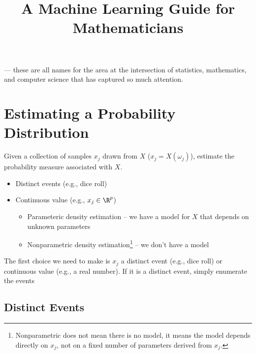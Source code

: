 \documentclass{tufte-handout}
\title{A Machine Learning Guide for Mathematicians}
\begin{document}
\maketitle

 ---
these are all names for the area at the intersection of statistics, 
mathematics, and computer science that has captured so much attention.
 

\section{Estimating a Probability Distribution}
Given a collection of samples $x_j$ drawn from $X$ ($x_j = X(\omega_j)$),
estimate the probability measure associated with $X$.


\begin{itemize}
	\item Distinct events (e.g., dice roll)
	\item Continuous value (e.g., $x_j \in \R^p$)
	\begin{itemize}
		\item Parameteric density estimation -- 
			we have a model for $X$ that depends on unknown parameters
		\item Nonparametric density estimation\footnote{
				Nonparametric does not mean there is no model, 
				it means the model depends directly on $x_j$, 
				not on a fixed number of parameters derived from $x_j$.} --
			we don't have a model
	\end{itemize}
\end{itemize}

The first choice we need to make is $x_j$ a distinct event (e.g., dice roll) or 
continuous value (e.g., a real number).
If it is a distinct event, simply enumerate the events 


\subsection{Distinct Events}
\end{document}
